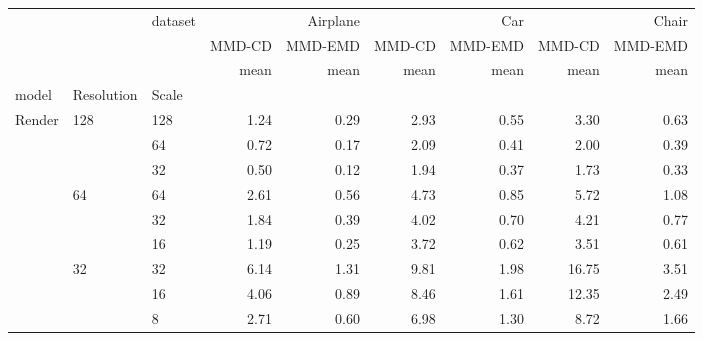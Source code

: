 \begin{tabular}{lllrrrrrr}
    \toprule
                               &                         & dataset & \multicolumn{2}{r}{Airplane} & \multicolumn{2}{r}{Car} & \multicolumn{2}{r}{Chair}                              \\
                               &                         &         & MMD-CD                       & MMD-EMD                 & MMD-CD                    & MMD-EMD & MMD-CD & MMD-EMD \\
                               &                         &         & mean                         & mean                    & mean                      & mean    & mean   & mean    \\
    model                      & Resolution              & Scale   &                              &                         &                           &         &        &         \\
    \midrule
    \multirow[t]{9}{*}{Render} & \multirow[t]{3}{*}{128} & 128     & 1.24                         & 0.29                    & 2.93                      & 0.55    & 3.30   & 0.63    \\
                               &                         & 64      & 0.72                         & 0.17                    & 2.09                      & 0.41    & 2.00   & 0.39    \\
                               &                         & 32      & 0.50                         & 0.12                    & 1.94                      & 0.37    & 1.73   & 0.33    \\
    \cline{2-9}
                               & \multirow[t]{3}{*}{64}  & 64      & 2.61                         & 0.56                    & 4.73                      & 0.85    & 5.72   & 1.08    \\
                               &                         & 32      & 1.84                         & 0.39                    & 4.02                      & 0.70    & 4.21   & 0.77    \\
                               &                         & 16      & 1.19                         & 0.25                    & 3.72                      & 0.62    & 3.51   & 0.61    \\
    \cline{2-9}
                               & \multirow[t]{3}{*}{32}  & 32      & 6.14                         & 1.31                    & 9.81                      & 1.98    & 16.75  & 3.51    \\
                               &                         & 16      & 4.06                         & 0.89                    & 8.46                      & 1.61    & 12.35  & 2.49    \\
                               &                         & 8       & 2.71                         & 0.60                    & 6.98                      & 1.30    & 8.72   & 1.66    \\
    \cline{1-9} \cline{2-9}
    \bottomrule
\end{tabular}
